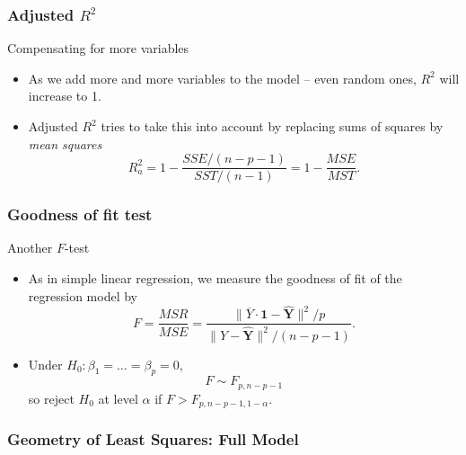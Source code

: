 \documentclass[handout]{beamer}
\begin{document}

   \begin{frame} \frametitle{Adjusted $R^2$}

   \begin{block}
   {Compensating for more variables}
   \begin{itemize}

   \item As we add more and more variables to the model -- even random ones, $R^2$ will increase to 1.

   \item Adjusted $R^2$ tries to take this into account by replacing
   sums of squares by {\em mean squares}
   $$
   R^2_a = 1 - \frac{SSE/(n-p-1)}{SST/(n-1)} = 1 - \frac{MSE}{MST}.$$
   \end{itemize}
   \end{block}
   \end{frame}


   \begin{frame} \frametitle{Goodness of fit test}

   \begin{block}
   {Another $F$-test}
   \begin{itemize}
   \item As in simple linear regression, we measure the goodness of fit
   of the regression model by
   $$
   F = \frac{MSR}{MSE} = \frac{\|\overline{Y}\cdot \pmb{1} - \widehat{\pmb{Y}}\|^2/p}{\|Y - \widehat{\pmb{Y}}\|^2/(n-p-1)}.$$

   \item Under $H_0:\beta_1 = \dots = \beta_p=0$,
   $$
   F \sim F_{p, n-p-1}$$
   so reject $H_0$ at level $\alpha$ if $F > F_{p,n-p-1,1-\alpha}.$
   \end{itemize}
   \end{block}
   \end{frame}


   \begin{frame} \frametitle{Geometry of Least Squares: Full Model}

   \end{frame}

\end{document}
